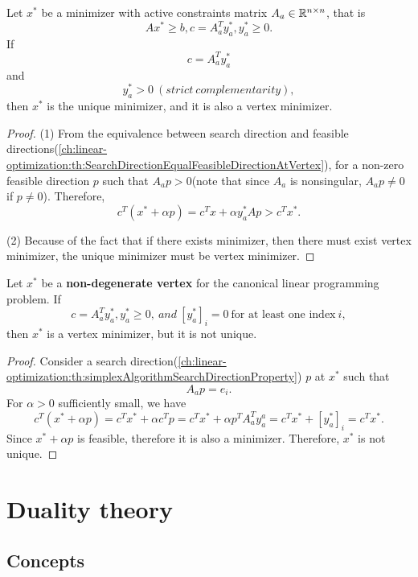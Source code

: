 \begin{refsection}
\begin{theorem}
Let $x^*$ be a minimizer with active constraints matrix $A_a\in \mathbb{R}^{n\times n}$, that is
$$Ax^* \geq b, c = A^T_ay_a^*, y_a^* \geq 0.$$
If 
$$c = A^T_a y_a^*$$
and
$$y^*_a > 0 ~(strict~ complementarity),$$
then $x^*$ is the unique minimizer, and it is also a vertex minimizer. 	
\end{theorem}
\begin{proof}
(1)
From the equivalence between search direction and feasible directions(\autoref{ch:linear-optimization:th:SearchDirectionEqualFeasibleDirectionAtVertex}), for a non-zero feasible direction $p$ such that $A_a p > 0$(note that since $A_a$ is nonsingular, $A_a p \neq 0$ if $p\neq 0$). Therefore, 
$$c^T(x^* + \alpha p) = c^Tx + \alpha y_a^* Ap > c^Tx^*.$$


(2) Because of the fact that if there exists minimizer, then there must exist vertex minimizer, the unique minimizer must be vertex minimizer.
\end{proof}


\begin{theorem}
Let $x^*$ be a \textbf{non-degenerate vertex} for the canonical linear programming problem. If 
$$c = A^T_a y_a^*, y_a^* \geq 0, ~ and ~ [y_a^*]_i = 0 ~\text{for at least one index}~ i,$$
then $x^*$ is a vertex minimizer, but it is not unique. 
\end{theorem}
\begin{proof}
Consider a search direction(\autoref{ch:linear-optimization:th:simplexAlgorithmSearchDirectionProperty}) $p$ at $x^*$ such that
$$A_a p = e_i.$$
For $\alpha > 0$ sufficiently small, we have
$$c^T(x^*+\alpha p) = c^Tx^* + \alpha c^Tp = c^Tx^* + \alpha p^TA^T_ay_a^a = c^Tx^* + [y_a^*]_i = c^Tx^*.$$
Since $x^*+\alpha p$ is feasible, therefore it is also a minimizer. Therefore, $x^*$ is not unique.
\end{proof}



\section{Duality theory}\label{ch:linear-optimization:ch:dualitytheorylinearprogramming}
\subsection{Concepts}



\end{refsection}
